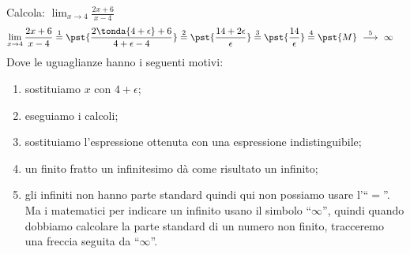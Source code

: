 \begin{esempio}
Calcola: \quad 
  \(\displaystyle \lim_{x \rightarrow 4} \frac{2x+6}{x-4}\)
\begin{align*}
\lim_{x \rightarrow 4} \frac{2x+6}{x-4} & \stackrel{1}{=} 
  \pst{\frac{2\tonda{4+\epsilon}+6}{4+\epsilon-4}} \stackrel{2}{=}  
  \pst{\frac{14 + 2 \epsilon}{\epsilon}} \stackrel{3}{=} 
  \pst{\frac{14}{\epsilon}} \stackrel{4}{=} 
  \pst{M} \stackrel{5}{~\longrightarrow~} \infty
\end{align*}
Dove le uguaglianze hanno i seguenti motivi:
\begin{enumerate} [nosep]
 \item sostituiamo \(x\) con \(4+\epsilon\);
 \item eseguiamo i calcoli;
 \item sostituiamo l'espressione ottenuta con una espressione 
   indistinguibile;
 \item un finito fratto un infinitesimo dà come risultato un infinito; 
 \item gli infiniti non hanno parte standard quindi qui non possiamo usare 
l'``\(=\)''. Ma i matematici per indicare un infinito usano il simbolo 
``\(\infty\)'', quindi quando dobbiamo calcolare la parte standard di un 
numero non finito, tracceremo una freccia seguita da ``\(\infty\)''.
\end{enumerate}
\end{esempio}

